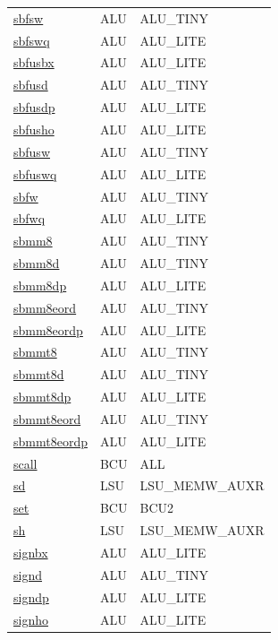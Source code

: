 \begin{small}
\begin{longtable}[l]{l l l}
\hyperlink{lvx.sbfsw}{sbfsw} & ALU & ALU\_TINY \\ 
\hyperlink{lvx.sbfswq}{sbfswq} & ALU & ALU\_LITE \\ 
\hyperlink{lvx.sbfusbx}{sbfusbx} & ALU & ALU\_LITE \\ 
\hyperlink{lvx.sbfusd}{sbfusd} & ALU & ALU\_TINY \\ 
\hyperlink{lvx.sbfusdp}{sbfusdp} & ALU & ALU\_LITE \\ 
\hyperlink{lvx.sbfusho}{sbfusho} & ALU & ALU\_LITE \\ 
\hyperlink{lvx.sbfusw}{sbfusw} & ALU & ALU\_TINY \\ 
\hyperlink{lvx.sbfuswq}{sbfuswq} & ALU & ALU\_LITE \\ 
\hyperlink{lvx.sbfw}{sbfw} & ALU & ALU\_TINY \\ 
\hyperlink{lvx.sbfwq}{sbfwq} & ALU & ALU\_LITE \\ 
\hyperlink{lvx.sbmm8}{sbmm8} & ALU & ALU\_TINY \\ 
\hyperlink{lvx.sbmm8d}{sbmm8d} & ALU & ALU\_TINY \\ 
\hyperlink{lvx.sbmm8dp}{sbmm8dp} & ALU & ALU\_LITE \\ 
\hyperlink{lvx.sbmm8eord}{sbmm8eord} & ALU & ALU\_TINY \\ 
\hyperlink{lvx.sbmm8eordp}{sbmm8eordp} & ALU & ALU\_LITE \\ 
\hyperlink{lvx.sbmmt8}{sbmmt8} & ALU & ALU\_TINY \\ 
\hyperlink{lvx.sbmmt8d}{sbmmt8d} & ALU & ALU\_TINY \\ 
\hyperlink{lvx.sbmmt8dp}{sbmmt8dp} & ALU & ALU\_LITE \\ 
\hyperlink{lvx.sbmmt8eord}{sbmmt8eord} & ALU & ALU\_TINY \\ 
\hyperlink{lvx.sbmmt8eordp}{sbmmt8eordp} & ALU & ALU\_LITE \\ 
\hyperlink{lvx.scall}{scall} & BCU & ALL \\ 
\hyperlink{lvx.sd}{sd} & LSU & LSU\_MEMW\_AUXR \\ 
\hyperlink{lvx.set}{set} & BCU & BCU2 \\ 
\hyperlink{lvx.sh}{sh} & LSU & LSU\_MEMW\_AUXR \\ 
\hyperlink{lvx.signbx}{signbx} & ALU & ALU\_LITE \\ 
\hyperlink{lvx.signd}{signd} & ALU & ALU\_TINY \\ 
\hyperlink{lvx.signdp}{signdp} & ALU & ALU\_LITE \\ 
\hyperlink{lvx.signho}{signho} & ALU & ALU\_LITE \\ 

\end{longtable}
\end{small}

